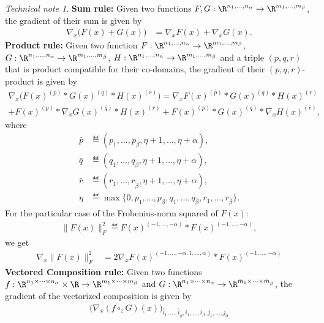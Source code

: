 \documentclass[11pt]{article}
\theoremstyle{remark}
\newtheorem{technical}{Technical note}
\begin{document}
\begin{technical}
  
\textbf{Sum rule:} Given two functions
$F,G:\R^{n_1,\dots,n_\alpha}\to\R^{m_1,\dots,m_\beta}$, the gradient of their sum is
given by
\begin{align*}
  \nabla_x \big( F(x)+G(x) \big)
  &=\nabla_x F(x)+ \nabla_xG(x).
\end{align*}
\textbf{Product rule:} Given two function
$F:\R^{n_1,\dots,n_\alpha}\to\R^{m_1,\dots,m_\beta}$, $G:\R^{n_1,\dots,n_\alpha}\to\R^{\bar
  m_1,\dots,\bar m_{\bar \beta}}$, $H:\R^{n_1,\dots,n_\alpha}\to\R^{\tilde
  m_1,\dots,\tilde m_{\bar \beta}}$ and a triple $(p,q,r)$ that is product
compatible for their co-domains, the gradient of their $(p,q,r)$-product
is given by
\begin{multline*}
  \nabla_x \big( F(x)^{(p)} * G(x)^{(q)} * H(x)^{(r)} \big)
  =\nabla_xF(x)^{(\bar p)} * G(x)^{(q)} * H(x)^{(r)}\\
  + F(x)^{(p)} * \nabla_xG(x)^{(\bar q)} * H(x)^{(r)}
  + F(x)^{(p)} *  G(x)^{(q)} * \nabla_x H(x)^{(\bar r)},
\end{multline*}
where 
\begin{align*}
  \bar p&\eqdef(p_1,\dots,p_\beta,\eta+1,\dots,\eta+\alpha), \\
  \bar q&\eqdef(q_1,\dots,q_{\bar \beta},\eta+1,\dots,\eta+\alpha), \\
  \bar r&\eqdef(r_1,\dots,r_{\tilde \beta},\eta+1,\dots,\eta+\alpha), \\
  \eta&\eqdef\max\{0,p_1,\dots,p_\beta,q_1,\dots,q_{\bar\beta},r_1,\dots,r_{\bar\beta}\}.
\end{align*}
For the particular case of the Frobenius-norm squared of $F(x)$:
\begin{align*}
  \| F(x) \|_F^2\eqdef F(x)^{(-1,\dots,-\alpha)} * F(x)^{(-1,\dots,-\alpha)},
\end{align*}
we get
\begin{align*}
  \nabla_x \|F(x)\|_F^2 &=2 \nabla_xF(x)^{(-1,\dots,-\alpha,1,\dots,\alpha)} * F(x)^{(-1,\dots,-\alpha)}
\end{align*}
\textbf{Vectored Composition rule:} Given two functions $f:\R^{n_1\times\cdots\times
  n_\alpha}\times\R\to\R^{m_1\times\cdots\times m_\beta}$ and $G:\R^{n_1\times\cdots\times n_\alpha}\to\R^{\bar m_1\times\cdots\times\bar
  m_{\bar\beta}}$, the gradient of the vectorized composition is given by
\begin{align*}
  \big( \nabla_x(f\circ_z G) (x)\big)_{\bar i_1,\dots,\bar i_{\bar \beta},i_1,\dots,i_\beta,j_1,\dots,j_\alpha}

\end{align*}
\end{technical}
\end{document}

